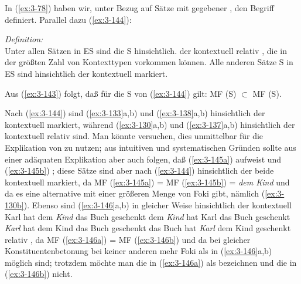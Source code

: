 \documentclass[output=paper]{langsci/langscibook}
\begin{document}
\addlines[2]
In (\ref{ex:3-78}) haben wir, unter Bezug auf Sätze mit gegebener ,
den Begriff  definiert. Parallel dazu (\ref{ex:3-144}):
\begin{exe}
\ex\label{ex:3-144}
\textit{Definition:} \\
Unter allen Sätzen in ES sind die S\textit{} hinsichtlich. der
 kontextuell relativ , die in der größten Zahl
von Kontexttypen vorkommen können. Alle anderen Sätze S\textit{} in
ES sind hinsichtlich der  kontextuell markiert.
\end{exe}
Aus (\ref{ex:3-143}) folgt, daß für die S\textit{} von (\ref{ex:3-144}) gilt: MF (S\textit{})
$\subset$ MF (S\textit{}).\vspace{-3pt}

Nach (\ref{ex:3-144}) sind (\ref{ex:3-133}a,b) und (\ref{ex:3-138}a,b) hinsichtlich der  kontextuell markiert, während (\ref{ex:3-130}a,b) und (\ref{ex:3-137}a,b) hinsichtlich der  kontextuell relativ  sind. Man
könnte versuchen, dies unmittelbar für die Explikation von  zu nutzen; aus intuitiven und systematischen Gründen sollte aus einer adäquaten Explikation aber auch folgen, daß \zb (\ref{ex:3-145a})   aufweist und (\ref{ex:3-145b}) ; diese Sätze sind aber nach (\ref{ex:3-144}) hinsichtlich der  beide kontextuell markiert, da MF (\ref{ex:3-145a}) = MF (\ref{ex:3-145b}) = \textit{dem Kind} und da es eine alternative  mit einer größeren Menge von Foki gibt, nämlich (\ref{ex:3-130b}). Ebenso sind (\ref{ex:3-146}a,b) in gleicher Weise hinsichtlich der 
kontextuell
\eal
\label{ex:3-145}
\ex
\label{ex:3-145a}
Karl hat dem \textit{Kind} das Buch geschenkt
\ex
\label{ex:3-145b}
dem \textit{Kind} hat Karl das Buch geschenkt
\zl
\eal
\label{ex:3-146}
\ex
\label{ex:3-146a}
\textit{Karl} hat dem Kind das Buch geschenkt
\ex
\label{ex:3-146b}
das Buch hat \textit{Karl} dem Kind geschenkt
\zl
relativ , da MF (\ref{ex:3-146a}) = MF (\ref{ex:3-146b}) und da bei gleicher Konstituentenbetonung bei keiner anderen  mehr Foki als in (\ref{ex:3-146}a,b) möglich sind; trotzdem möchte man die  in (\ref{ex:3-146a}) als  bezeichnen und die in (\ref{ex:3-146b}) nicht.
\end{document}
